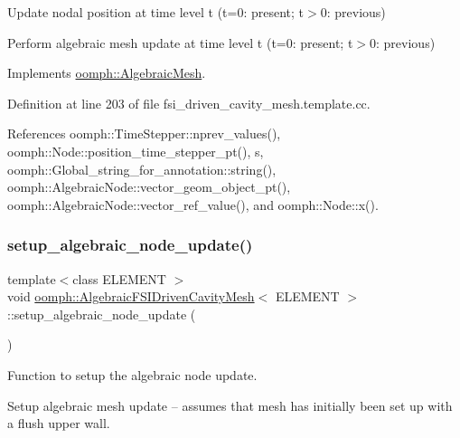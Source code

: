 Update nodal position at time level t (t=0\+: present; t$>$0\+: previous) 

Perform algebraic mesh update at time level t (t=0\+: present; t$>$0\+: previous) 

Implements \hyperlink{classoomph_1_1AlgebraicMesh_ab01d6f93354f3c4e5c9d1f0a5885a65b}{oomph\+::\+Algebraic\+Mesh}.



Definition at line 203 of file fsi\+\_\+driven\+\_\+cavity\+\_\+mesh.\+template.\+cc.



References oomph\+::\+Time\+Stepper\+::nprev\+\_\+values(), oomph\+::\+Node\+::position\+\_\+time\+\_\+stepper\+\_\+pt(), s, oomph\+::\+Global\+\_\+string\+\_\+for\+\_\+annotation\+::string(), oomph\+::\+Algebraic\+Node\+::vector\+\_\+geom\+\_\+object\+\_\+pt(), oomph\+::\+Algebraic\+Node\+::vector\+\_\+ref\+\_\+value(), and oomph\+::\+Node\+::x().

\mbox{\label{classoomph_1_1AlgebraicFSIDrivenCavityMesh_a7f6b7c3dae1c61c2cdb0cbd229173114}} 
\subsubsection{\texorpdfstring{setup\+\_\+algebraic\+\_\+node\+\_\+update()}{setup\_algebraic\_node\_update()}}
{\footnotesize\ttfamily template$<$class E\+L\+E\+M\+E\+NT $>$ \\
void \hyperlink{classoomph_1_1AlgebraicFSIDrivenCavityMesh}{oomph\+::\+Algebraic\+F\+S\+I\+Driven\+Cavity\+Mesh}$<$ E\+L\+E\+M\+E\+NT $>$\+::setup\+\_\+algebraic\+\_\+node\+\_\+update (\begin{DoxyParamCaption}{ }\end{DoxyParamCaption})\hspace{0.3cm}{\ttfamily [protected]}}



Function to setup the algebraic node update. 

Setup algebraic mesh update -- assumes that mesh has initially been set up with a flush upper wall. 

